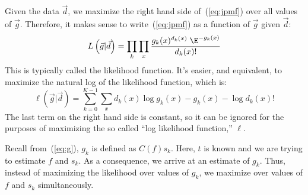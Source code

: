 Given the data $\vec{d} $, we maximize the right hand side 
of~(\ref{eq:jpmf}) over all values of $\vec{g} $. Therefore, it makes sense to 
write~(\ref{eq:jpmf}) as a function of $\vec{g} $ given $\vec{d} $:
\begin{equation*}%
L\left(\vec{g} |\vec{d}  \right) 
= \prod_{k}\prod_{x} \frac{g_k(x)^{d_k(x)}\; \E^{-g_k(x)}}{d_k(x)!}
\end{equation*}
This is typically called the likelihood function. 
It's easier, and equivalent, to maximize the natural log
of the likelihood function, which is:
\begin{equation}\label{eq:likelihood}
\ell\left(\vec{g} |\vec{d}  \right) 
= \sum_{k=0}^{K-1} \sum_{x} d_k(x)\log g_k(x) - g_k(x) - \log
d_k(x)!
\end{equation}
The last term on the right hand side is constant, so it can be ignored for the
purposes of maximizing the so called ``log likelihood function,'' $\ell$.

Recall from~(\ref{eq:g}), $g_k$ is defined as $C(f)s_k$.  Here, $t$ is
known and we are trying to estimate $f$ and $s_k$.  As a 
consequence, we arrive at an estimate of $g_k$.  Thus,
instead of maximizing the likelihood over values of $g_k$, we maximize over
values of $f$ and $s_k$ simultaneously. 


